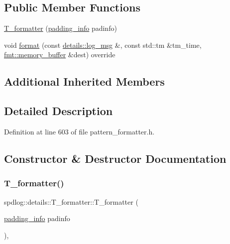 \subsection*{Public Member Functions}
\begin{DoxyCompactItemize}
\item 
\hyperlink{classspdlog_1_1details_1_1_t__formatter_affd0c9557cd9649339f10abd943608ff}{T\+\_\+formatter} (\hyperlink{structspdlog_1_1details_1_1padding__info}{padding\+\_\+info} padinfo)
\item 
void \hyperlink{classspdlog_1_1details_1_1_t__formatter_a338d37f02f3a9a4376acc3d4b655eda3}{format} (const \hyperlink{structspdlog_1_1details_1_1log__msg}{details\+::log\+\_\+msg} \&, const std\+::tm \&tm\+\_\+time, \hyperlink{format_8h_a21cbf729f69302f578e6db21c5e9e0d2}{fmt\+::memory\+\_\+buffer} \&dest) override
\end{DoxyCompactItemize}
\subsection*{Additional Inherited Members}


\subsection{Detailed Description}


Definition at line 603 of file pattern\+\_\+formatter.\+h.



\subsection{Constructor \& Destructor Documentation}
\mbox{\label{classspdlog_1_1details_1_1_t__formatter_affd0c9557cd9649339f10abd943608ff}} 
\subsubsection{\texorpdfstring{T\+\_\+formatter()}{T\_formatter()}}
{\footnotesize\ttfamily spdlog\+::details\+::\+T\+\_\+formatter\+::\+T\+\_\+formatter (\begin{DoxyParamCaption}\item[{\hyperlink{structspdlog_1_1details_1_1padding__info}{padding\+\_\+info}}]{padinfo }\end{DoxyParamCaption})\hspace{0.3cm}{\ttfamily [inline]}, {\ttfamily [explicit]}}



